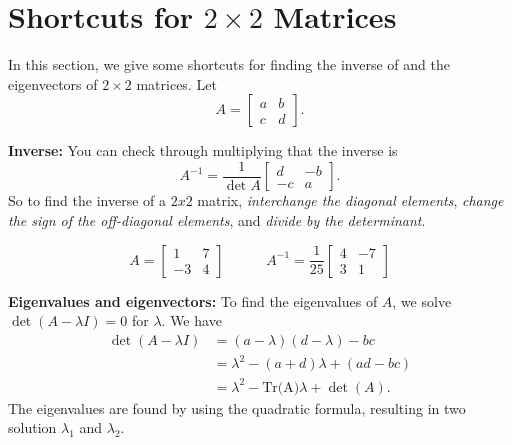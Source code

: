 %
%
\section{Shortcuts for $2\times 2$ Matrices}
In this section, we give
some shortcuts for finding the inverse of and the eigenvectors of $2\times 2$ matrices.
%
Let
\[
   A = \begin{bmatrix}
              a & b \\ c & d
       \end{bmatrix}.
\]

\noindent
\textbf{Inverse:}
You can check through multiplying that the inverse is
\[
   A^{-1} = \frac{1}{\det A}\begin{bmatrix}
                               d & -b \\ -c & a
                            \end{bmatrix}.
\]
So to find the inverse of a $2x2$ matrix,
\emph{interchange the diagonal elements}, \emph{change the sign of the off-diagonal elements}, and
\emph{divide by the determinant}.

\begin{xexample}
\[
  A = \begin{bmatrix}
          1 & 7 \\ -3 & 4
      \end{bmatrix}
  \quad\quad\quad
  A^{-1} = \frac{1}{25}\begin{bmatrix}
                          4 & -7 \\ 3 & 1
                       \end{bmatrix}
\]
\end{xexample}

\noindent
{\bf Eigenvalues and eigenvectors:}
To find the eigenvalues of $A$, we solve
$\det(A-\lambda I)=0$ for $\lambda$.
We have
\[
\begin{split}
   \det(A-\lambda I) & = (a-\lambda)(d-\lambda)-bc \\
                     & = \lambda^2-(a+d)\lambda + (ad-bc) \\
		     & = \lambda^2 - \textrm{Tr(A)}\lambda + \det(A).
\end{split}
\]
The eigenvalues are found by using the quadratic
formula, resulting in two solution $\lambda_1$ and $\lambda_2$.


